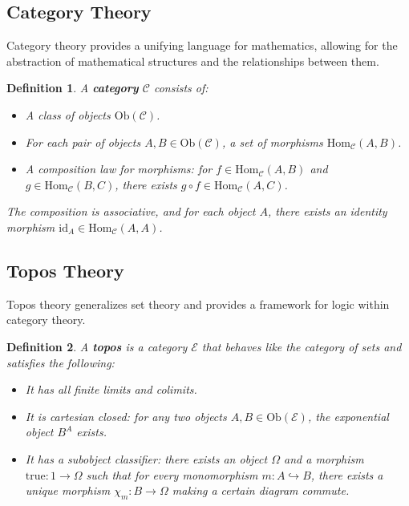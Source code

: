 \documentclass[12pt]{article}
\newtheorem{definition}{Definition}[section]
\newcommand{\Hom}{\mathrm{Hom}}
\newcommand{\Ob}{\mathrm{Ob}}
\begin{document}
\subsection{Category Theory}

Category theory provides a unifying language for mathematics, allowing for the abstraction of mathematical structures and the relationships between them.

\begin{definition}
A \textbf{category} $\mathcal{C}$ consists of:
\begin{itemize}
    \item A class of objects $\Ob(\mathcal{C})$.
    \item For each pair of objects $A, B \in \Ob(\mathcal{C})$, a set of morphisms $\Hom_{\mathcal{C}}(A, B)$.
    \item A composition law for morphisms: for $f \in \Hom_{\mathcal{C}}(A, B)$ and $g \in \Hom_{\mathcal{C}}(B, C)$, there exists $g \circ f \in \Hom_{\mathcal{C}}(A, C)$.
\end{itemize}
The composition is associative, and for each object $A$, there exists an identity morphism $\mathrm{id}_A \in \Hom_{\mathcal{C}}(A, A)$.
\end{definition}

\subsection{Topos Theory}

Topos theory generalizes set theory and provides a framework for logic within category theory.

\begin{definition}
A \textbf{topos} is a category $\mathcal{E}$ that behaves like the category of sets and satisfies the following:
\begin{itemize}
    \item It has all finite limits and colimits.
    \item It is cartesian closed: for any two objects $A, B \in \Ob(\mathcal{E})$, the exponential object $B^A$ exists.
    \item It has a subobject classifier: there exists an object $\Omega$ and a morphism $\mathrm{true}: 1 \rightarrow \Omega$ such that for every monomorphism $m: A \hookrightarrow B$, there exists a unique morphism $\chi_m: B \rightarrow \Omega$ making a certain diagram commute.
\end{itemize}
\end{definition}
\end{document}
